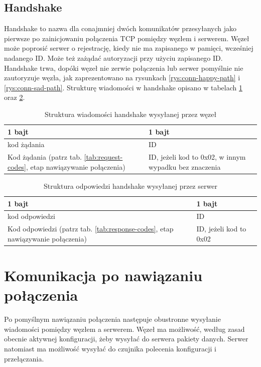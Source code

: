 \documentclass[12pt,oneside,a4paper]{book}
\theoremstyle{break}
\begin{document}
\subsection{Handshake}
Handshake to nazwa dla conajmniej dwóch komunikatów przesyłanych jako
pierwsze po zainicjowaniu połączenia TCP pomiędzy węzłem i serwerem.
Węzeł może poprosić serwer o rejestrację, kiedy nie ma zapisanego
w pamięci, wcześniej nadanego ID. Może też zażądać autoryzacji przy 
użyciu zapisanego ID. Handshake trwa, dopóki węzeł nie zerwie 
połączenia lub serwer pomyślnie nie zautoryzuje węzła, jak zaprezentowano
na rysunkach \ref{rys:conn-happy-path} i \ref{rys:conn-sad-path}.
Strukturę wiadomości w handshake opisano w tabelach \ref{tab:handshake-sensor}
oraz \ref{tab:handshake-server}.

\begin{table}[ht]
    \centering
    \begin{tabularx}{\textwidth}{|X | X | X|}
        \hline
        1 bajt & 1 bajt\\
        \hline
        kod żądania & ID \\
        \hline
        Kod żądania (patrz tab. \ref{tab:request-codes}, etap nawiązywanie połączenia) & ID, jeżeli kod to 0x02, w innym wypadku bez znaczenia \\
        \hline
        \end{tabularx}
        \caption{Struktura wiadomości handshake wysyłanej przez węzeł}
        \label{tab:handshake-sensor}
\end{table}

\begin{table}[ht]
    \centering
    \begin{tabularx}{\textwidth}{|X | X | X|}
    \hline
    1 bajt & 1 bajt\\
    \hline
    kod odpowiedzi & ID \\
    \hline
    Kod odpowiedzi (patrz tab. \ref{tab:response-codes}, etap nawiązywanie połączenia) & ID, jeżeli kod to 0x02 \\
    \hline
    \end{tabularx}
    \caption{Struktura odpowiedzi handshake wysyłanej przez serwer}
    \label{tab:handshake-server}
\end{table}

\section{Komunikacja po nawiązaniu połączenia}
Po pomyślnym nawiązaniu połączenia następuje obustronne wysyłanie wiadomości
pomiędzy węzłem a serwerem. Węzeł ma możliwość, według zasad
obecnie aktywnej konfiguracji, żeby wysyłać do serwera pakiety danych.
Serwer natomiast ma możliwość wysyłać do czujnika polecenia konfiguracji
i przełączania.
\end{document}
